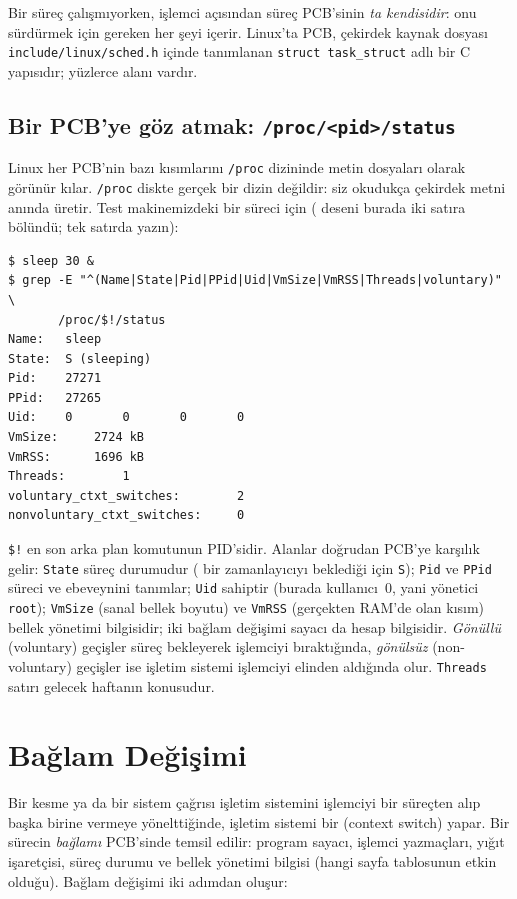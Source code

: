 Bir süreç çalışmıyorken, işlemci açısından süreç PCB'sinin \emph{ta kendisidir}: onu sürdürmek için gereken her şeyi içerir. Linux'ta PCB, çekirdek kaynak dosyası \texttt{include/linux/sched.h} içinde tanımlanan \texttt{struct task\_struct} adlı bir C yapısıdır; yüzlerce alanı vardır.

\subsection{Bir PCB'ye göz atmak: \texttt{/proc/<pid>/status}}

Linux her PCB'nin bazı kısımlarını \texttt{/proc} dizininde metin dosyaları olarak görünür kılar. \texttt{/proc} diskte gerçek bir dizin değildir: siz okudukça çekirdek metni anında üretir. Test makinemizdeki bir  süreci için ( deseni burada iki satıra bölündü; tek satırda yazın):

\begin{lstlisting}[style=term]
$ sleep 30 &
$ grep -E "^(Name|State|Pid|PPid|Uid|VmSize|VmRSS|Threads|voluntary)" \
       /proc/$!/status
Name:   sleep
State:  S (sleeping)
Pid:    27271
PPid:   27265
Uid:    0       0       0       0
VmSize:     2724 kB
VmRSS:      1696 kB
Threads:        1
voluntary_ctxt_switches:        2
nonvoluntary_ctxt_switches:     0
\end{lstlisting}

\verb|$!| en son arka plan komutunun PID'sidir. Alanlar doğrudan PCB'ye karşılık gelir: \texttt{State} süreç durumudur ( bir zamanlayıcıyı beklediği için \texttt{S}); \texttt{Pid} ve \texttt{PPid} süreci ve ebeveynini tanımlar; \texttt{Uid} sahiptir (burada kullanıcı~$0$, yani yönetici \texttt{root}); \texttt{VmSize} (sanal bellek boyutu) ve \texttt{VmRSS} (gerçekten RAM'de olan kısım) bellek yönetimi bilgisidir; iki bağlam değişimi sayacı da hesap bilgisidir. \emph{Gönüllü} (voluntary) geçişler süreç bekleyerek işlemciyi bıraktığında, \emph{gönülsüz} (non-voluntary) geçişler ise işletim sistemi işlemciyi elinden aldığında olur. \texttt{Threads} satırı gelecek haftanın konusudur.

\section{Bağlam Değişimi}
\label{sec:ctx}

Bir kesme ya da bir sistem çağrısı işletim sistemini işlemciyi bir süreçten alıp başka birine vermeye yönelttiğinde, işletim sistemi bir  (context switch) yapar. Bir sürecin \emph{bağlamı} PCB'sinde temsil edilir: program sayacı, işlemci yazmaçları, yığıt işaretçisi, süreç durumu ve bellek yönetimi bilgisi (hangi sayfa tablosunun etkin olduğu). Bağlam değişimi iki adımdan oluşur:


